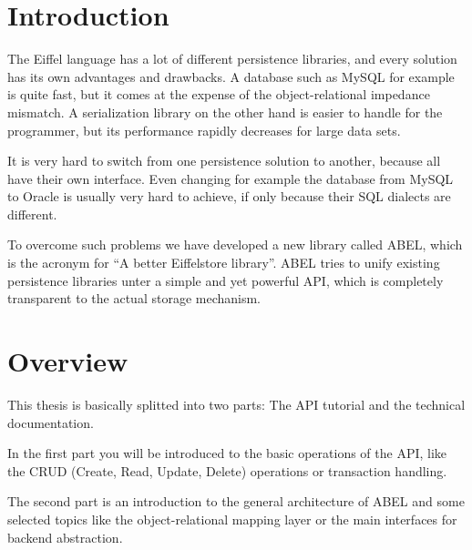 \section{Introduction}

The Eiffel language \cite{EcmaEiffel} \cite{Meyer09} has a lot of different persistence libraries, and every solution has its own advantages and drawbacks.
A database such as MySQL \cite {MySQL} for example is quite fast, but it comes at the expense of the object-relational impedance mismatch\cite{ORImpedance}.
A serialization library on the other hand is easier to handle for the programmer, but its performance rapidly decreases for large data sets.

It is very hard to switch from one persistence solution to another, because all have their own interface.
Even changing for example the data\-base from MySQL to Oracle \cite{Oracle} is usually very hard to achieve, if only because their SQL dialects are different.

To overcome such problems we have developed a new library called ABEL, which is the acronym for ``A better Eiffelstore library''.
ABEL tries to unify existing persistence libraries unter a simple and yet powerful API, which is completely transparent to the actual storage mechanism.


\section{Overview}
This thesis is basically splitted into two parts: The API tutorial and the technical documentation.

In the first part you will be introduced to the basic operations of the API, like the CRUD (Create, Read, Update, Delete) operations or transaction handling.

The second part is an introduction to the general architecture of ABEL and some selected topics like the object-relational mapping layer or the main interfaces for backend abstraction.
